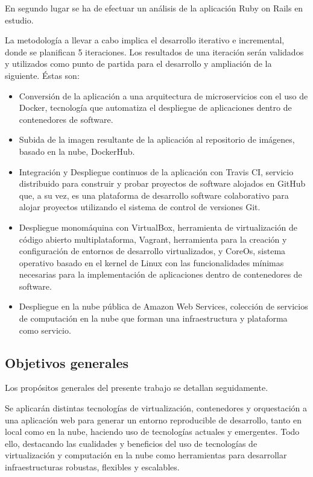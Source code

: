 En segundo lugar se ha de efectuar un análisis de la aplicación Ruby on Rails en estudio.

La metodología a llevar a cabo implica el desarrollo iterativo e incremental, donde se planifican 5 iteraciones. Los resultados de una iteración serán validados y utilizados como punto de partida para el desarrollo y ampliación de la siguiente. Éstas son:
\begin{itemize}
\item Conversión de la aplicación a una arquitectura de microservicios con el uso de Docker, tecnología que automatiza el despliegue de aplicaciones dentro de contenedores de software.
\item Subida de la imagen resultante de la aplicación al repositorio de imágenes, basado en la nube, DockerHub.
\item Integración y Despliegue continuos de la aplicación con Travis CI, servicio distribuido para construir y probar proyectos de software alojados en GitHub que, a su vez, es una plataforma de desarrollo software colaborativo para alojar proyectos utilizando el sistema de control de versiones Git.
\item Despliegue monomáquina con VirtualBox, herramienta de virtualización de código abierto multiplataforma, Vagrant, herramienta para la creación y configuración de entornos de desarrollo virtualizados, y CoreOs, sistema operativo basado en el kernel de Linux con las funcionalidades mínimas necesarias para la implementación de aplicaciones dentro de contenedores de software.
\item Despliegue en la nube pública de Amazon Web Services, colección de servicios de computación en la nube que forman una infraestructura y plataforma como servicio.
\end{itemize}

\subsection{Objetivos generales}

Los propósitos generales del presente trabajo se detallan seguidamente.

Se aplicarán distintas tecnologías de virtualización, contenedores y orquestación a una aplicación web para generar un entorno reproducible de desarrollo, tanto en local como en la nube, haciendo uso de tecnologías actuales y emergentes. Todo ello, destacando las cualidades y beneficios del uso de tecnologías de virtualización y computación en la nube como herramientas para desarrollar infraestructuras robustas, flexibles y escalables.

